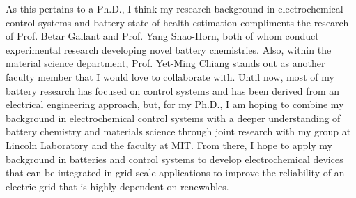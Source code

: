 \documentclass[12pt]{article}
\begin{document}
\par
As this pertains to a Ph.D., I think my research background in electrochemical control systems and battery state-of-health estimation compliments the research of Prof. Betar Gallant and Prof. Yang Shao-Horn, both of whom conduct experimental research developing novel battery chemistries. Also, within the material science department, Prof. Yet-Ming Chiang stands out as another faculty member that I would love to collaborate with.  Until now, most of my battery research has focused on control systems and has been derived from an electrical engineering approach, but, for my Ph.D., I am hoping to combine my background in electrochemical control systems with a deeper understanding of battery chemistry and materials science through joint research with my group at Lincoln Laboratory and the faculty at MIT.  From there, I hope to apply my background in batteries and control systems to develop electrochemical devices that can be integrated in grid-scale applications to improve the reliability of an electric grid that is highly dependent on renewables. 
\end{document}
